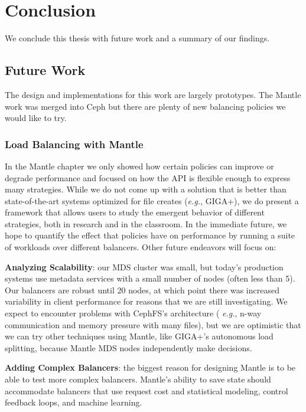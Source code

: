 \chapter{Conclusion}
\label{chp:conclusion}

We conclude this thesis with future work and a summary of our findings.

\section{Future Work}

The design and implementations for this work are largely prototypes. The Mantle
work was merged into Ceph but there are plenty of new balancing policies we
would like to try.

\subsection{Load Balancing with Mantle}

In the Mantle chapter we only showed how certain policies can improve or degrade
performance and focused on how the API is flexible enough to express many
strategies.  While we do not come up with a solution that is better than
state-of-the-art systems optimized for file creates ({\it e.g.}, GIGA+), we do
present a framework that allows users to study the emergent behavior of
different strategies, both in research and in the classroom. In the immediate
future, we hope to quantify the effect that policies have on performance by
running a suite of workloads over different balancers. Other future endeavors
will focus on:

\textbf{Analyzing Scalability}: our MDS cluster was small, but today's
production systems use metadata services with a small number of nodes (often
less than 5). Our balancers are robust until 20 nodes, at which point there was
increased variability in client performance for reasons that we are still
investigating. We expect to encounter problems with CephFS's architecture ({\it
e.g.}, n-way communication and memory pressure with many files), but we are
optimistic that we can try other techniques using Mantle, like GIGA+'s
autonomous load splitting, because Mantle MDS nodes independently make
decisions. 


\textbf{Adding Complex Balancers}: the biggest reason for designing Mantle is
to be able to test more complex balancers. Mantle's ability to save state
should accommodate balancers that use request cost and statistical modeling,
control feedback loops, and machine learning.

